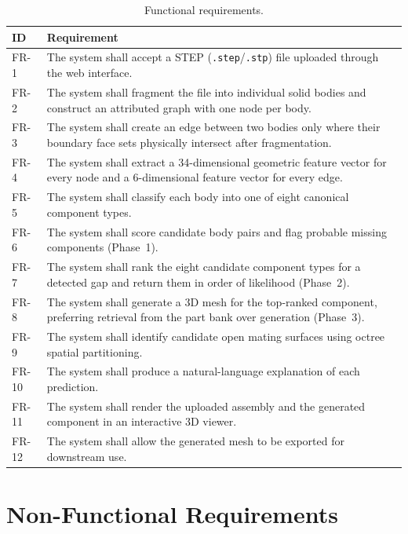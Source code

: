 \documentclass[12pt,oneside,a4paper]{report}
\begin{document}
\begin{table}[h]
\centering
\caption{Functional requirements.}
\label{tab:funcreq}
\small
\begin{tabularx}{\textwidth}{@{}C{1.4cm}X@{}}
\toprule
\textbf{ID} & \textbf{Requirement} \\
\midrule
FR-1 & The system shall accept a STEP (\texttt{.step}/\texttt{.stp}) file uploaded through the web interface. \\
FR-2 & The system shall fragment the file into individual solid bodies and construct an attributed graph with one node per body. \\
FR-3 & The system shall create an edge between two bodies only where their boundary face sets physically intersect after fragmentation. \\
FR-4 & The system shall extract a 34-dimensional geometric feature vector for every node and a 6-dimensional feature vector for every edge. \\
FR-5 & The system shall classify each body into one of eight canonical component types. \\
FR-6 & The system shall score candidate body pairs and flag probable missing components (Phase~1). \\
FR-7 & The system shall rank the eight candidate component types for a detected gap and return them in order of likelihood (Phase~2). \\
FR-8 & The system shall generate a 3D mesh for the top-ranked component, preferring retrieval from the part bank over generation (Phase~3). \\
FR-9 & The system shall identify candidate open mating surfaces using octree spatial partitioning. \\
FR-10 & The system shall produce a natural-language explanation of each prediction. \\
FR-11 & The system shall render the uploaded assembly and the generated component in an interactive 3D viewer. \\
FR-12 & The system shall allow the generated mesh to be exported for downstream use. \\
\bottomrule
\end{tabularx}
\end{table}

\section{Non-Functional Requirements}
\end{document}

